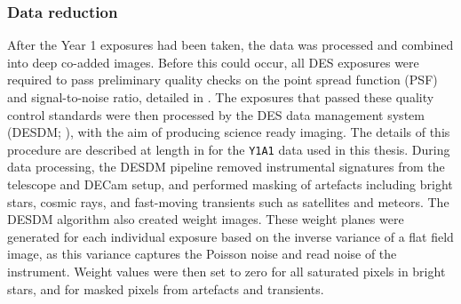 \subsubsection{Data reduction}\label{subsubsection:data_reduction}
After the Year 1 exposures had been taken, the data was processed and combined into deep co-added images. Before this could occur, all DES exposures were required to pass preliminary quality checks on the point spread function (PSF) and signal-to-noise ratio, detailed in  \cite{2018ApJS..235...33D}. The exposures that passed these quality control standards were then processed by the DES data management system (DESDM;  \citealt{2011arXiv1109.6741S, 2012SPIE.8451E..0DM, 2018PASP..130g4501M}), with the aim of producing science ready imaging. The details of this procedure are described at length in \cite{2018ApJS..235...33D} for the \texttt{Y1A1} data used in this thesis. During data processing, the DESDM pipeline removed instrumental signatures from the telescope and DECam setup, and performed masking of artefacts including bright stars, cosmic rays, and fast-moving transients such as satellites and meteors. The DESDM algorithm also created weight images. These weight planes were generated for each individual exposure based on the inverse variance of a flat field image, as this variance captures the Poisson noise and read noise of the instrument. Weight values were then set to zero for all saturated pixels in bright stars, and for masked pixels from artefacts and transients.  \par



